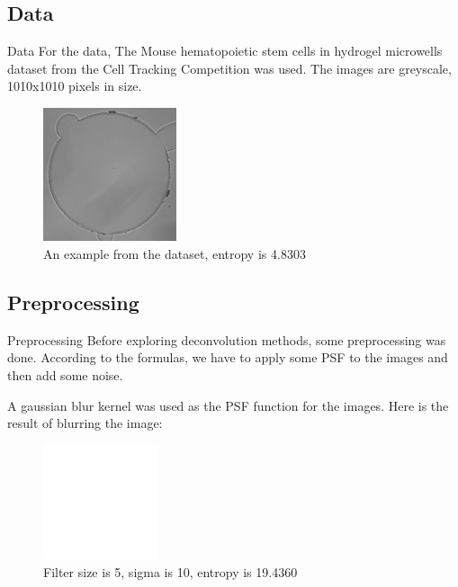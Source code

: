 \documentclass[aspectratio=1610]{beamer}
\begin{document}
\begin{frame}
  \tableofcontents[currentsection, subsectionstyle=show/show/hide]
\end{frame}

\subsection {Data}
\begin{frame}{Data}
  For the data, The Mouse hematopoietic stem cells in hydrogel microwells dataset from 
  the Cell Tracking Competition was used. The images are greyscale, 1010x1010 
  pixels in size.
  \begin{figure}
    \centering
    \includegraphics[width=0.35\textwidth]{images/cell.png}
    \caption{An example from the dataset, entropy is 4.8303}
    \label{fig:cell}
  \end{figure}
\end{frame}

\subsection{Preprocessing}
\begin{frame}{Preprocessing}
  Before exploring deconvolution methods, some preprocessing
  was done. According to the formulas, we have to apply some PSF
  to the images and then add some noise. 
  
  A gaussian blur kernel was used as the PSF function for the images. 
  Here is the result of blurring the image:
  \begin{figure}
    \centering
    \includegraphics[width=0.30\textwidth]{images/blurred.png}
    \caption{Filter size is 5, sigma is 10, entropy is 19.4360}
    \label{fig:blurred}
  \end{figure}
\end{frame}
\end{document}
